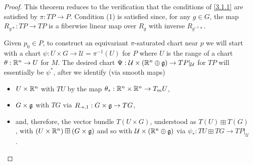 \begin{proof}
This theorem reduces to the verification that the conditions of \ref{3.1.1} are satisfied by $\pi: TP \to P$. Condition (1) is satisfied since, for any $g \in G$, the map $R_{g*}:TP \to TP$ is a fiberwise linear map over $R_g$ with inverse $R_{g^{-1} *}$.

Given $p_0 \in P$, to construct an equivariant $\pi$-saturated chart near $p$ we will start with a chart $\psi:U \times G \to \mathcal U = \pi^{-1}(U)$ for $P$ where $U$ is the range of a chart $\theta:\mathbb{R}^n \to U$ for $M$. The desired chart $\Psi: \mathcal U \times (\mathbb{R}^n \oplus \mathfrak{g}) \to TP|_{\mathcal U}$ for $TP$ will essentially be $\psi^*$, after we identify (via smooth maps) 
    \begin{itemize}
    
    \item $U \times \mathbb{R}^n$ with $TU$ by the map $\theta_{*}: \mathbb{R}^n \times \mathbb{R}^n \to T_m U$,  
    
    \item $G \times \mathfrak{g}$ with $TG$ via $R_{\cdot *, 1}: G \times \mathfrak{g} \to T G$,
    
    \item and, therefore, the vector bundle $T(U \times G)$, understood as $T(U) \boxplus T(G)$, with $(U \times \mathbb{R}^n) \boxplus (G \times \mathfrak{g})$ and so with $\mathcal U \times (\mathbb{R}^n \oplus \mathfrak{g})$ via $\psi_*: TU \boxplus TG \to TP|_{\mathcal U}$.
    
    \end{itemize}


\end{proof}
